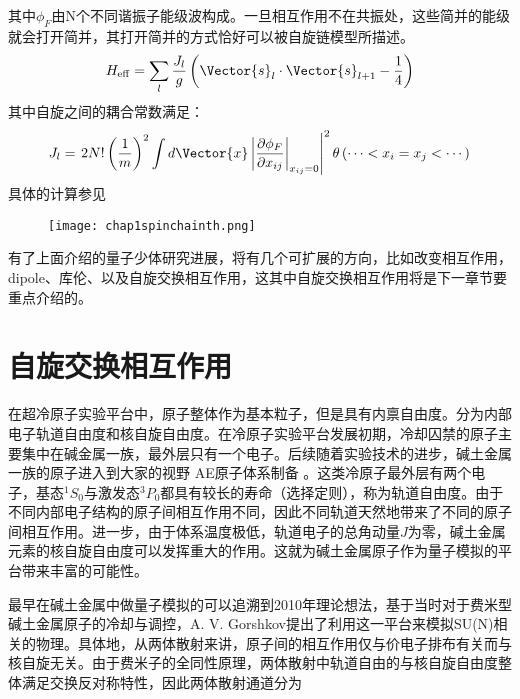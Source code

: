 其中$\phi_F$由N个不同谐振子能级波构成。一旦相互作用不在共振处，这些简并的能级就会打开简并，其打开简并的方式恰好可以被自旋链模型所描述。
\begin{equation}
H_{\mathrm{eff}}=\sum_{l} \frac{J_{l}}{g}\left(\Vector{s}_{l} \cdot \Vector{s}_{l+1}-\frac{1}{4}\right)
\end{equation}
其中自旋之间的耦合常数满足：
\begin{equation}
J_{l}=\left.2 N !\left(\frac{1}{m}\right)^{2} \int d \Vector{x}\left|\frac{\partial \phi_{F}}{\partial x_{i j}}\right|_{x_{i j}=0}\right|^{2} \theta\left(\cdots<x_{i}=x_{j}<\cdots\right)
\end{equation}
具体的计算参见\cite{Guan2009exact,Santos2014spinchain,Yang2016effective}
\begin{figure}[!htbp]
    \centering
    \texttt{[image: chap1spinchainth.png]}
    \label{spinchainth}
\end{figure}

有了上面介绍的量子少体研究进展，将有几个可扩展的方向，比如改变相互作用，dipole、库伦、以及自旋交换相互作用，这其中自旋交换相互作用将是下一章节要重点介绍的。


\section{自旋交换相互作用}\label{sec:spin-exchange}
在超冷原子实验平台中，原子整体作为基本粒子，但是具有内禀自由度。分为内部电子轨道自由度和核自旋自由度。在冷原子实验平台发展初期，冷却囚禁的原子主要集中在碱金属一族，最外层只有一个电子。后续随着实验技术的进步，碱土金属一族的原子进入到大家的视野{\color{red} AE原子体系制备 }。这类冷原子最外层有两个电子，基态${}^1S_0$与激发态${}^3P_0$都具有较长的寿命（选择定则），称为轨道自由度。由于不同内部电子结构的原子间相互作用不同，因此不同轨道天然地带来了不同的原子间相互作用。进一步，由于体系温度极低，轨道电子的总角动量$J$为零，碱土金属元素的核自旋自由度可以发挥重大的作用。这就为碱土金属原子作为量子模拟的平台带来丰富的可能性。

最早在碱土金属中做量子模拟的可以追溯到2010年理论想法，基于当时对于费米型碱土金属原子的冷却与调控，A. V. Gorshkov\cite{gorshkov2010two}提出了利用这一平台来模拟SU(N)相关的物理。具体地，从两体散射来讲，原子间的相互作用仅与价电子排布有关而与核自旋无关。由于费米子的全同性原理，两体散射中轨道自由的与核自旋自由度整体满足交换反对称特性，因此两体散射通道分为

